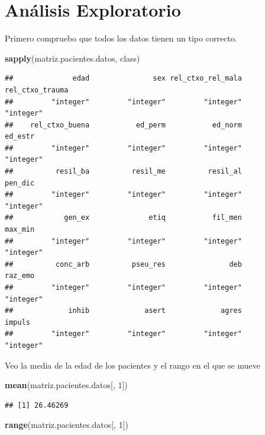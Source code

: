 \documentclass[]{article}
\newenvironment{Shaded}{\begin{snugshade}}{\end{snugshade}}
\newcommand{\DecValTok}[1]{\textcolor[rgb]{0.00,0.00,0.81}{#1}}
\newcommand{\KeywordTok}[1]{\textcolor[rgb]{0.13,0.29,0.53}{\textbf{#1}}}
\newcommand{\NormalTok}[1]{#1}
\begin{document}
\hypertarget{analisis-exploratorio}{%
\section{Análisis Exploratorio}\label{analisis-exploratorio}}

Primero compruebo que todos los datos tienen un tipo correcto.

\begin{Shaded}
\begin{Highlighting}[]
\KeywordTok{sapply}\NormalTok{(matriz.pacientes.datos, class)}
\end{Highlighting}
\end{Shaded}

\begin{verbatim}
##              edad               sex rel_ctxo_rel_mala   rel_ctxo_trauma 
##         "integer"         "integer"         "integer"         "integer" 
##    rel_ctxo_buena           ed_perm           ed_norm           ed_estr 
##         "integer"         "integer"         "integer"         "integer" 
##          resil_ba          resil_me          resil_al           pen_dic 
##         "integer"         "integer"         "integer"         "integer" 
##            gen_ex              etiq           fil_men           max_min 
##         "integer"         "integer"         "integer"         "integer" 
##          conc_arb          pseu_res               deb           raz_emo 
##         "integer"         "integer"         "integer"         "integer" 
##             inhib             asert             agres            impuls 
##         "integer"         "integer"         "integer"         "integer"
\end{verbatim}

Veo la media de la edad de los pacientes y el rango en el que se mueve

\begin{Shaded}
\begin{Highlighting}[]
\KeywordTok{mean}\NormalTok{(matriz.pacientes.datos[, }\DecValTok{1}\NormalTok{])}
\end{Highlighting}
\end{Shaded}

\begin{verbatim}
## [1] 26.46269
\end{verbatim}

\begin{Shaded}
\begin{Highlighting}[]
\KeywordTok{range}\NormalTok{(matriz.pacientes.datos[, }\DecValTok{1}\NormalTok{])}
\end{Highlighting}
\end{Shaded}
\end{document}

